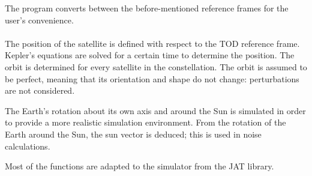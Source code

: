 The program converts between the before-mentioned reference frames for the user's convenience.\\\\
The position of the satellite is defined with respect to the \acs{TOD} reference frame. Kepler's equations are solved for a certain time to determine the position. The orbit is determined for every satellite in the constellation. The orbit is assumed to be perfect, meaning that its orientation and shape do not change: perturbations are not considered. 

The Earth's rotation about its own axis and around the Sun is simulated in order to provide a more realistic simulation environment. From the rotation of the Earth around the Sun, the sun vector is deduced; this is used in noise calculations.

Most of the functions are adapted to the simulator from the \ac{JAT} library. 